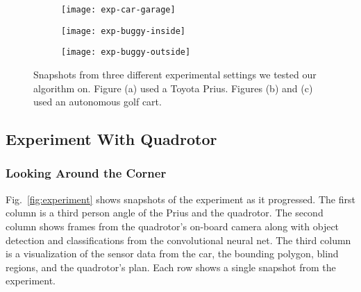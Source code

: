 \begin{figure}[t!]

    \centering

    \begin{subfigure}[t]{\textwidth}

        \centering
        \texttt{[image: exp-car-garage]}
        \caption{}

        \label{fig:exp-car-garage}

    \end{subfigure}

    \vspace*{1mm}

    \begin{subfigure}[t]{\textwidth}

        \centering
        \texttt{[image: exp-buggy-inside]}
        \caption{}

        \label{fig:exp-buggy-inside}

    \end{subfigure}

    \vspace*{1mm}

    \begin{subfigure}[t]{\textwidth}
        \centering
        \texttt{[image: exp-buggy-outside]}
        \caption{}

        \label{fig:exp-buggy-outside}

    \end{subfigure}

    \caption{Snapshots from three different experimental settings we tested our
    algorithm on. Figure (a) used a Toyota Prius. Figures (b) and (c) used an
autonomous golf cart.}

    \label{fig:exps}

\end{figure}

\subsection{Experiment With Quadrotor}

\subsubsection{Looking Around the Corner}

Fig.~\ref{fig:experiment} shows snapshots of the experiment as it progressed.
The first column is a third person angle of the Prius and the quadrotor. The
second column shows frames from the quadrotor's on-board camera along with
object detection and classifications from the convolutional neural net. The
third column is a visualization of the sensor data from the car, the bounding
polygon, blind regions, and the quadrotor's plan. Each row shows a single
snapshot from the experiment.

